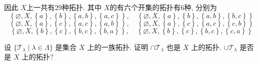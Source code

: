 \documentclass[../main.tex]{subfiles}
\begin{document}
\begin{solution}
\begin{enumerate}
\[        \]  
    \end{enumerate}
    因此 \(  X  \)上一共有29种拓扑.  其中 \(  X  \)的有六个开集的拓扑有6种, 分别为    \[
         \left\{ \varnothing,X,\left\{ a \right\},\left\{ b \right\},\left\{ a,b \right\}, \left\{ a,c \right\} \right\},\quad  \left\{ \varnothing,X,\left\{ a \right\},\left\{ b \right\},\left\{ a,b \right\} , \left\{ b,c \right\}\right\}
        \] \[
         \left\{ \varnothing,X,\left\{ a \right\},\left\{ c \right\},\left\{ a,c \right\}, \left\{ a,b \right\} \right\},\quad  \left\{ \varnothing,X,\left\{ a \right\},\left\{ c \right\},\left\{ a,c \right\} , \left\{ c,b\right\}\right\}
        \]  \[
         \left\{ \varnothing,X,\left\{ b \right\},\left\{ c \right\},\left\{ b,c \right\}, \left\{ b,a \right\} \right\},\quad  \left\{ \varnothing,X,\left\{ b \right\},\left\{ c \right\},\left\{ b,c \right\} , \left\{ c,a \right\}\right\}
        \]
\end{solution}

\begin{exercise}{}{}
设 $\{\mathcal{T}_\lambda \mid \lambda \in \Lambda\}$ 是集合 $X$ 上的一族拓扑. 证明 $\cap \mathcal{T}_\lambda$ 也是 $X$ 上的拓扑. $\cup \mathcal{T}_\lambda$ 是否是 $X$ 上的拓扑?
\end{exercise}
\end{document}
